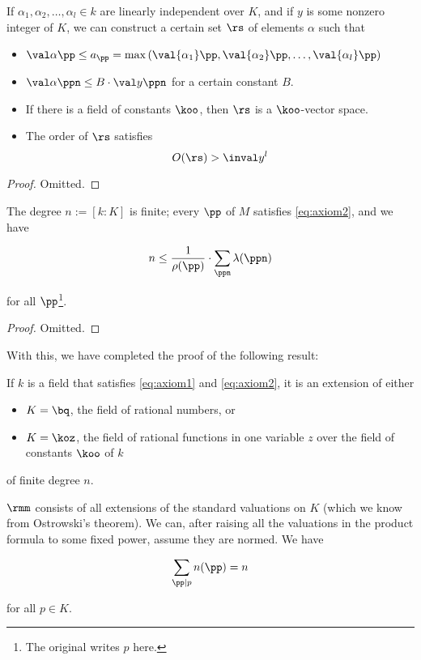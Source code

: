 \begin{lemma}
  If $\alpha_1,\alpha_2,\ldots,\alpha_l\in k$ are linearly independent over $K$,
  and if $y$ is some nonzero integer of $K$, we can construct a certain set $\rs$
  of elements $\alpha$ such that

  \begin{itemize}
  \item $\val\alpha\pp\leq a_\pp = \max\left( \val{\alpha_1}\pp,\val{\alpha_2}\pp,\ldots,\val{\alpha_l}\pp\right)$
  \item $\val\alpha\ppn \leq B\cdot\val y\ppn$ for a certain constant $B$.
  \item If there is a field of constants $\koo$, then $\rs$ is a $\koo$-vector space.
  \item The order of $\rs$ satisfies
    \[ O({\rs}) > \inval y ^l \]
  \end{itemize}
\end{lemma}
\begin{proof}
  Omitted.
\end{proof}

\begin{lemma}
  The degree $n := [k:K]$ is finite; every $\pp$ of $M$ satisfies
  \ref{eq:axiom2}, and we have

  \[ n \leq \frac1{\rho(\pp)} \cdot \sum_{\ppn}\lambda(\ppn) \]

  for all $\pp$\footnote{The original writes $p$ here.}.
\end{lemma}
\begin{proof}
  Omitted.
\end{proof}

With this, we have completed the proof of the following result:

\begin{thm}
 If $k$ is a field that satisfies \ref{eq:axiom1} and \ref{eq:axiom2}, it is an
 extension of either
 \begin{itemize}
 \item $K = \bq$, the field of rational numbers, or
 \item $K = \koz$, the field of rational functions in one variable $z$ over the
   field of constants $\koo$ of $k$
 \end{itemize}
 of finite degree $n$.

 $\rmm$ consists of all extensions of the standard valuations on $K$ (which we
 know from Ostrowski's theorem). We can, after raising all the valuations in the
 product formula to some fixed power, assume they are normed. We have

 \[ \sum_{\pp|p}n(\pp) = n \]

 for all $p\in K$.
\end{thm}
